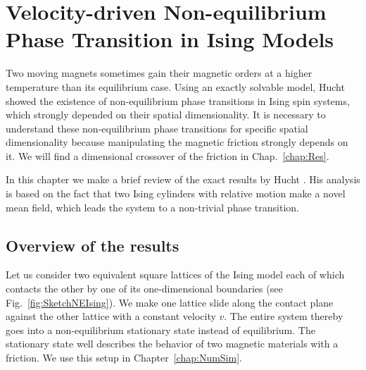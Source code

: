 
\chapter{Velocity-driven Non-equilibrium Phase Transition in Ising Models}\label{ch:review}

Two moving magnets sometimes gain their magnetic orders at a higher temperature than its equilibrium case. Using an exactly solvable model, Hucht \cite{Hucht2009b} showed the existence of non-equilibrium phase transitions in Ising spin systems, which strongly depended on their spatial dimensionality. It is necessary to understand these non-equilibrium phase transitions for specific spatial dimensionality because manipulating the magnetic friction strongly depends on it. We will find a dimensional crossover of the friction in Chap.~\ref{chap:Res}.

In this chapter we make a brief review of the exact results by Hucht \cite{Hucht2009b}. His analysis is based on the fact that two Ising cylinders with relative motion make a novel mean field, which leads the system to a non-trivial phase transition.

\section{Overview of the results}

Let us consider two equivalent square lattices of the Ising model each of which contacts the other by one of its one-dimensional boundaries (see Fig.~\ref{fig:SketchNEIsing}). We make one lattice slide along the contact plane against the other lattice with a constant velocity $v$. The entire system thereby goes into a non-equilibrium stationary state instead of equilibrium. The stationary state well describes the behavior of two magnetic materials with a friction. We use this setup in Chapter~\ref{chap:NumSim}.

